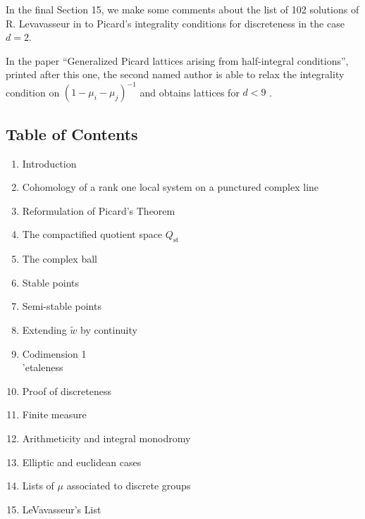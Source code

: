 \documentclass[12pt,a4paper]{article}
\theoremstyle{plain}
\theoremstyle{definition}
\theoremstyle{remark}
\numberwithin{equation}{section}
\begin{document}
In the final Section 15, we make some comments about the list of 102 solutions of R. Levavasseur in \cite{LeVavasseur} to Picard's integrality conditions for discreteness in the case $d = 2$.

In the paper ``Generalized Picard lattices arising from half-integral conditions'', printed after this one, the second named author is able to relax the integrality condition on $(1 - \mu_i - \mu_j)^{-1}$ and obtains lattices for $d < 9$ \cite{MostowII}.

\subsection*{Table of Contents}
\begin{enumerate}[label=\arabic*.]
\item Introduction
\item Cohomology of a rank one local system on a punctured complex line
\item Reformulation of Picard's Theorem
\item The compactified quotient space $Q_{\mathrm{st}}$
\item The complex ball
\item Stable points
\item Semi-stable points
\item Extending $\widetilde{w}$ by continuity
\item Codimension 1 \\'etaleness
\item Proof of discreteness
\item Finite measure
\item Arithmeticity and integral monodromy
\item Elliptic and euclidean cases
\item Lists of $\mu$ associated to discrete groups
\item LeVavasseur's List
\end{enumerate}
\end{document}
